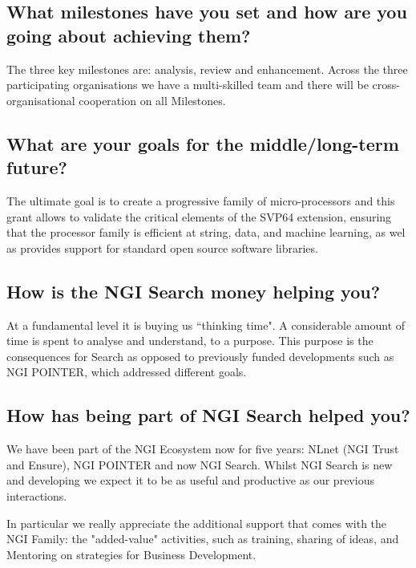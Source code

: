 \subsection{What milestones have you set and how are you going about achieving them?}

The three key milestones are: analysis, review and enhancement.
Across the three participating organisations we have a multi-skilled
team and there will be cross-organisational cooperation on all Milestones.

\subsection{What are your goals for the middle/long-term future?}

The ultimate goal is to create a progressive family of micro-processors
and this grant allows to validate the critical elements of the
\acrshort{SVP64} extension, ensuring that the processor family is efficient at string,
data, and machine learning, as wel as provides support for standard open
source software libraries.

\subsection{How is the \acrshort{NGI} Search money helping you?}

At a fundamental level it is buying us ``thinking time".
A considerable amount of time is spent to analyse and understand,
to a purpose. This purpose is the consequences for Search as
opposed to previously funded developments such as \acrshort{NGI} POINTER,
which addressed different goals.

\subsection{How has being part of \acrshort{NGI} Search helped you?}

We have been part of the \acrshort{NGI} Ecosystem now for five years:
NLnet (\acrshort{NGI} Trust and Ensure), \acrshort{NGI} POINTER and now \acrshort{NGI} Search.
Whilst \acrshort{NGI} Search is new and developing we expect it to be as
useful and productive as our previous interactions.

In particular we really appreciate the additional support that
comes with the \acrshort{NGI} Family: the "added-value" activities, such
as training, sharing of ideas, and Mentoring on strategies for
Business Development.

